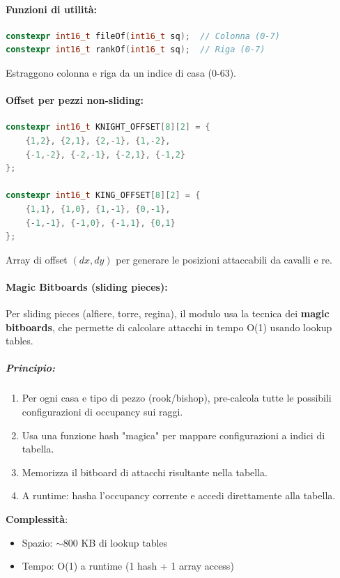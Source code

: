 \paragraph{Funzioni di utilità:}

\begin{lstlisting}[language=C++]
constexpr int16_t fileOf(int16_t sq);  // Colonna (0-7)
constexpr int16_t rankOf(int16_t sq);  // Riga (0-7)
\end{lstlisting}

Estraggono colonna e riga da un indice di casa (0-63).

\paragraph{Offset per pezzi non-sliding:}

\begin{lstlisting}[language=C++]
constexpr int16_t KNIGHT_OFFSET[8][2] = {
    {1,2}, {2,1}, {2,-1}, {1,-2},
    {-1,-2}, {-2,-1}, {-2,1}, {-1,2}
};

constexpr int16_t KING_OFFSET[8][2] = {
    {1,1}, {1,0}, {1,-1}, {0,-1},
    {-1,-1}, {-1,0}, {-1,1}, {0,1}
};
\end{lstlisting}

Array di offset $(dx, dy)$ per generare le posizioni attaccabili da cavalli e re.

\paragraph{Magic Bitboards (sliding pieces):}

Per sliding pieces (alfiere, torre, regina), il modulo usa la tecnica dei
\textbf{magic bitboards}, che permette di calcolare attacchi in tempo O(1) usando
lookup tables.

\subparagraph{Principio:}
\begin{enumerate}
  \item Per ogni casa e tipo di pezzo (rook/bishop), pre-calcola tutte le possibili
        configurazioni di occupancy sui raggi.
  \item Usa una funzione hash "magica" per mappare configurazioni a indici di tabella.
  \item Memorizza il bitboard di attacchi risultante nella tabella.
  \item A runtime: hasha l'occupancy corrente e accedi direttamente alla tabella.
\end{enumerate}

\textbf{Complessità}:
\begin{itemize}
  \item Spazio: $\sim$800 KB di lookup tables
  \item Tempo: O(1) a runtime (1 hash + 1 array access)
\end{itemize}

